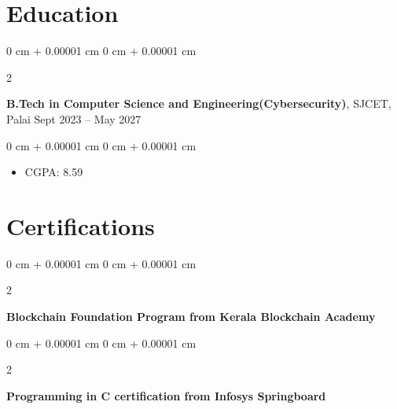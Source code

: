 \documentclass[10pt, a4paper]{article}
\newenvironment{highlights}{
    \begin{itemize}[
        topsep=0.10 cm,
        parsep=0.10 cm,
        partopsep=0pt,
        itemsep=0pt,
        leftmargin=0 cm + 10pt
    ]
}{
    \end{itemize}
} %
\newenvironment{onecolentry}{
    \begin{adjustwidth}{
        0 cm + 0.00001 cm
    }{
        0 cm + 0.00001 cm
    }
}{
    \end{adjustwidth}
} %
\newenvironment{twocolentry}[2][]{
    \onecolentry
    \def\secondColumn{#2}
    \setcolumnwidth{\fill, 4.5 cm}
    \begin{paracol}{2}
}{
    \switchcolumn \raggedleft \secondColumn
    \end{paracol}
    \endonecolentry
} %
\begin{document}
    \section{Education}
     
        \begin{twocolentry}{
            Sept 2023 – May 2027
        }
            \textbf{B.Tech in Computer Science and Engineering(Cybersecurity)},   SJCET, Palai\end{twocolentry}

        \vspace{0.10 cm}
        \begin{onecolentry}
            \begin{highlights}
                \item CGPA: 8.59
            \end{highlights}
        \end{onecolentry}

        \section{Certifications}
    
            \begin{twocolentry}{
            }
                \textbf{Blockchain Foundation Program from Kerala Blockchain Academy}
                \end{twocolentry}
                
        \begin{twocolentry}{
            }
                \textbf{Programming in C certification from Infosys Springboard}
                \end{twocolentry}
\end{document}
